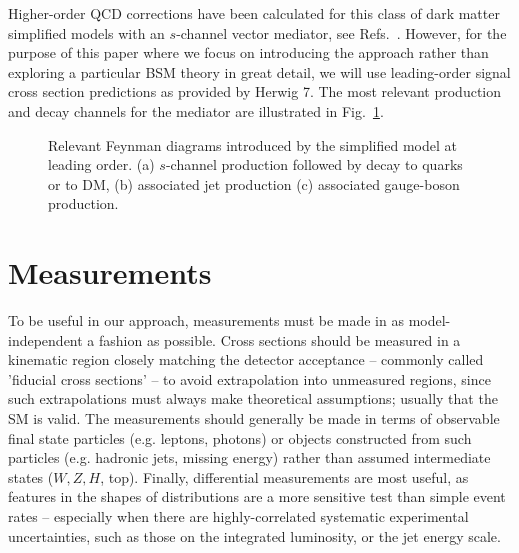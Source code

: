 \documentclass[floatfix]{article}
\begin{document}
Higher-order QCD corrections have been calculated for this class of dark matter simplified models 
with an $s$-channel vector mediator, see Refs.~\cite{Fox:2012ru,Haisch:2013ata,Backovic:2015soa,Neubert:2015fka}. However, for the purpose of this paper where we focus on introducing the \Contur approach rather than exploring 
a particular BSM theory in great detail, we will use leading-order signal cross section predictions as provided by Herwig 7.
%
The most relevant production and decay channels for the mediator are illustrated in Fig.~\ref{fig:feyndia}.

\begin{figure}[hp]
\centering
{}
\caption{Relevant Feynman diagrams introduced by the simplified model at leading order. (a) $s$-channel production followed by decay to quarks or to DM, (b) associated jet production (c) associated gauge-boson production.}\label{fig:feyndia}
\end{figure}


\section{Measurements}\label{sec:measurements}

To be useful in our approach, measurements must be made in as model-independent a fashion as possible. 
Cross sections should be measured in a kinematic region closely matching the detector acceptance -- commonly called 
'fiducial cross sections' -- to avoid extrapolation into unmeasured regions, since such extrapolations must always make 
theoretical assumptions; usually that the SM is valid. The measurements should generally be made in terms of observable final
state particles (e.g. leptons, photons) or objects constructed from such particles (e.g. hadronic jets, missing energy) 
rather than assumed intermediate states ($W, Z, H$, top). Finally, differential measurements are most useful, as features
in the shapes of distributions are a more sensitive test than simple event rates -- especially when there are
highly-correlated systematic experimental uncertainties, such as those on the integrated luminosity, or the jet energy scale.
\end{document}
